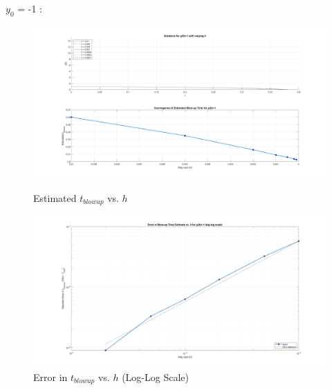 \documentclass{article}
\begin{document}
$y_0$ = -1 :
\begin{figure}[htbp]
    \centering
    \begin{minipage}[b]{0.45\textwidth}
        \centering
        \includegraphics[width=\textwidth]{pic/euler_err-1-1.png }
        \caption{Estimated $t_{blowup}$ vs. $h$}
        \label{fig:image1}
    \end{minipage}
    \hspace{0.05\textwidth}
    \begin{minipage}[b]{0.45\textwidth}
        \centering
        \includegraphics[width=\textwidth]{pic/euler_err-1-2.png}
        \caption{Error in $t_{blowup}$ vs. $h$ (Log-Log Scale) }
        \label{fig:image2}
    \end{minipage}
\end{figure}
\end{document}

